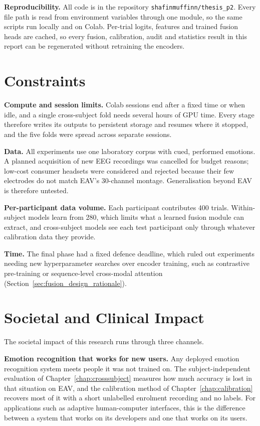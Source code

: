 \textbf{Reproducibility.} All code is in the repository \texttt{shafinmuffinn/thesis\_p2}. Every file path is read from environment variables through one module, so the same scripts run locally and on Colab. Per-trial logits, features and trained fusion heads are cached, so every fusion, calibration, audit and statistics result in this report can be regenerated without retraining the encoders.

\section{Constraints}

\textbf{Compute and session limits.} Colab sessions end after a fixed time or when idle, and a single cross-subject fold needs several hours of GPU time. Every stage therefore writes its outputs to persistent storage and resumes where it stopped, and the five folds were spread across separate sessions.

\textbf{Data.} All experiments use one laboratory corpus with cued, performed emotions. A planned acquisition of new EEG recordings was cancelled for budget reasons; low-cost consumer headsets were considered and rejected because their few electrodes do not match EAV's 30-channel montage. Generalisation beyond EAV is therefore untested.

\textbf{Per-participant data volume.} Each participant contributes 400 trials. Within-subject models learn from 280, which limits what a learned fusion module can extract, and cross-subject models see each test participant only through whatever calibration data they provide.

\textbf{Time.} The final phase had a fixed defence deadline, which ruled out experiments needing new hyperparameter searches over encoder training, such as contrastive pre-training or sequence-level cross-modal attention (Section~\ref{sec:fusion_design_rationale}).

\section{Societal and Clinical Impact}
The societal impact of this research runs through three channels.

\textbf{Emotion recognition that works for new users.} Any deployed emotion recognition system meets people it was not trained on. The subject-independent evaluation of Chapter~\ref{chap:crosssubject} measures how much accuracy is lost in that situation on EAV, and the calibration method of Chapter~\ref{chap:calibration} recovers most of it with a short unlabelled enrolment recording and no labels. For applications such as adaptive human-computer interfaces, this is the difference between a system that works on its developers and one that works on its users.

